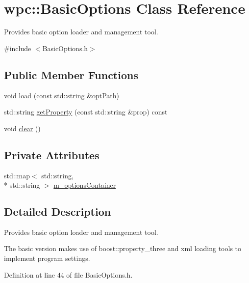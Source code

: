 \hypertarget{classwpc_1_1_basic_options}{\section{wpc\-:\-:Basic\-Options Class Reference}
\label{classwpc_1_1_basic_options}
}


Provides basic option loader and management tool.  




{\ttfamily \#include $<$Basic\-Options.\-h$>$}

\subsection*{Public Member Functions}
\begin{DoxyCompactItemize}
\item 
void \hyperlink{classwpc_1_1_basic_options_a8decea38387ae1931eb4881e5e9bba6b}{load} (const std\-::string \&opt\-Path)
\item 
std\-::string \hyperlink{classwpc_1_1_basic_options_a1d884bdcc2b57dcca8150f99087da00f}{get\-Property} (const std\-::string \&prop) const 
\item 
void \hyperlink{classwpc_1_1_basic_options_a7115f0f0625d18adb978dad4c030db29}{clear} ()
\end{DoxyCompactItemize}
\subsection*{Private Attributes}
\begin{DoxyCompactItemize}
\item 
std\-::map$<$ std\-::string, \\*
std\-::string $>$ \hyperlink{classwpc_1_1_basic_options_a6a023610b86624f5b037d030be9f385c}{m\-\_\-options\-Container}
\end{DoxyCompactItemize}


\subsection{Detailed Description}
Provides basic option loader and management tool. 

The basic version makes use of boost\-::property\-\_\-three and xml loading tools to implement program settings. 

Definition at line 44 of file Basic\-Options.\-h.



